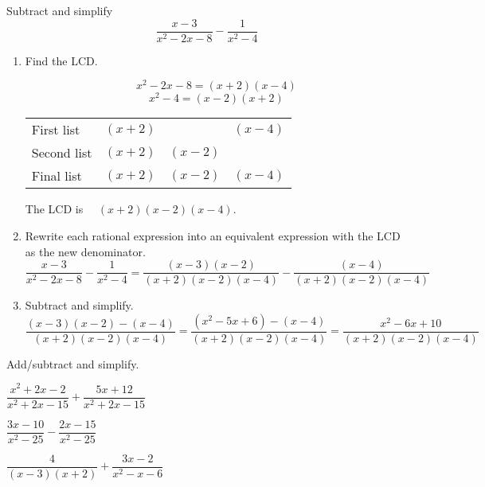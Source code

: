 	\vspace{-0.25\baselineskip}

	\begin{example}
		Subtract and simplify 
		\[\dfrac{x-3}{x^2-2x-8}- \dfrac{1}{x^2-4}\]		
	\end{example}
	\begin{solution}
		\begin{enumerate}[label={\textbf{\textup{Step \arabic*.}}~}]
			\item Find the LCD. 
			      \begin{multicols}{2}
				      \[x^2-2x-8=(x+2)(x-4)\] \[x^2-4=(x-2)(x+2)\]

				      \columnbreak

				      \begin{tabular}{l|c|c|c}
					      First list  & $(x+2)$ &         & $(x-4)$ \\
					      Second list & $(x+2)$ & $(x-2)$ &         \\
					      \hline
					      Final list  & $(x+2)$ & $(x-2)$ & $(x-4)$
				      \end{tabular}
			      \end{multicols}
			      \hfill The LCD is ~~$(x+2)(x-2)(x-4)$.\hfill\null
			\item Rewrite each rational expression into an equivalent expression with the LCD as the new denominator. 
			      \[
				      \dfrac{x-3}{x^2-2x-8}- \dfrac{1}{x^2-4}=\dfrac{(x-3)(x-2)}{(x+2)(x-2)(x-4)}-\dfrac{(x-4)}{(x+2)(x-2)(x-4)}
			      \]
			\item Subtract and simplify.
			      \[
				      \dfrac{(x-3)(x-2)-(x-4)}{(x+2)(x-2)(x-4)}=\dfrac{(x^2-5x+6)-(x-4)}{(x+2)(x-2)(x-4)}=\dfrac{x^2-6x+10}{(x+2)(x-2)(x-4)}
			      \]
		\end{enumerate}
	\end{solution}



\newpage

\begin{exercise}
	Add/subtract and simplify.\\
	\begin{enumerate*}[label={(\arabic*)~}]
		\item $\dfrac{x^2+2x-2}{x^2+2x-15}+\dfrac{5x+12}{x^2+2x-15}$
		\item $\dfrac{3x-10}{x^2-25}-\dfrac{2x-15}{x^2-25}$
		\item $\dfrac{4}{(x-3)(x+2)}+\dfrac{3x-2}{x^2-x-6}$
		\hfill\null
	\end{enumerate*}
\end{exercise}

